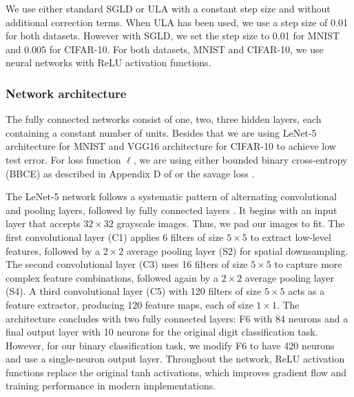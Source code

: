 \documentclass{article} %
\begin{document}
We use either standard SGLD or ULA with a constant step size and without additional correction terms. When ULA has been used, we use a step size of 0.01 for both datasets. However with SGLD, we set the step size to 0.01 for MNIST and 0.005 for CIFAR-10. For both datasets, MNIST and CIFAR-10, we use neural networks with ReLU activation functions. 


\subsubsection{Network architecture} \label{sec:net_arch}
The fully connected networks consist of one, two, three hidden layers, each containing a constant number of units. Besides that we are using LeNet-5 architecture for MNIST and VGG16 architecture for CIFAR-10 to achieve low test error. For loss function $\ell $, we are using either bounded binary
cross-entropy (BBCE) as described in Appendix D of \cite{dziugaite2018data} or
the savage loss \citep{masnadi2008design}.

The LeNet-5 network follows a systematic pattern of alternating convolutional and pooling layers, followed by fully connected layers \citep{lecun2002gradient}. It begins with an input layer that accepts \(32 \times 32\) grayscale images. Thus, we pad our images to fit. 
The first convolutional layer (C1) applies 6 filters of size \(5 \times 5\) to extract low-level features, followed by a \(2 \times 2\) average pooling layer (S2) for spatial downsampling. The second convolutional layer (C3) uses 16 filters of size \(5 \times 5\) to capture more complex feature combinations, followed again by a \(2 \times 2\) average pooling layer (S4). 
A third convolutional layer (C5) with 120 filters of size \(5 \times 5\) acts as a feature extractor, producing 120 feature maps, each of size \(1 \times 1\). The architecture concludes with two fully connected layers: F6 with 84 neurons and a final output layer with 10 neurons for the original digit classification task. However, for our binary classification task, we modify F6 to have 420 neurons and use a single-neuron output layer. Throughout the network, ReLU activation functions replace the original tanh activations, which improves gradient flow and training performance in modern implementations.
\end{document}
